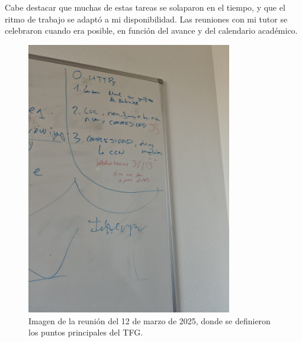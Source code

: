 \documentclass[a4paper, 12pt]{book}
\begin{document}
Cabe destacar que muchas de estas tareas se solaparon en el tiempo, y que el ritmo de trabajo se adaptó a mi disponibilidad. Las reuniones con mi tutor se celebraron cuando era posible, en función del avance y del calendario académico.


\begin{center}
\end{center}

\begin{figure}[H]
    \centering
    \includegraphics[width=0.8\textwidth]{img/reunion_2025-03-12.png}
    \caption{Imagen de la reunión del 12 de marzo de 2025, donde se definieron los puntos principales del TFG.}
    \label{fig:reunion-marzo}
\end{figure}

\end{document}

